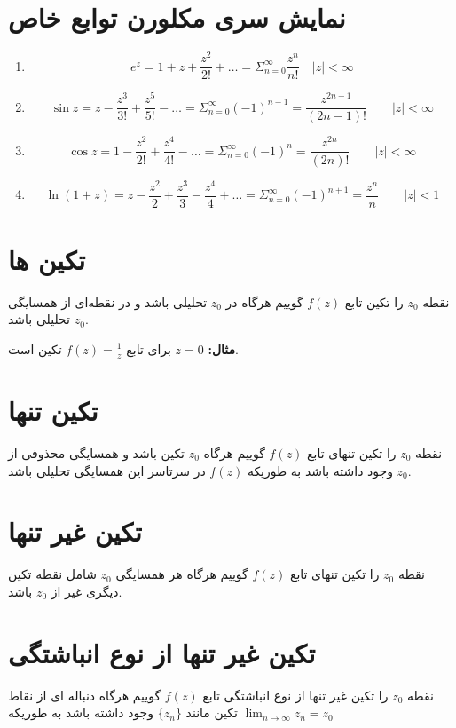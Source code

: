 \documentclass[12pt]{report}
\begin{document}
\section{نمایش سری مکلورن توابع خاص}
\begin{enumerate}
	
	\item
	$$e^z = 1 +z + \frac{z^2}{2!} + \dots = \Sigma_{n = 0}^{\infty} \frac{z^n}{n!} \quad |z|< \infty$$
	\item
	$$\sin z = z - \frac{z^3}{3!} +  \frac{z^5}{5!} - \dots = \Sigma_{n = 0}^{\infty} (-1)^{n -1 } = \frac{z^{2n - 1}}{(2n - 1)!}\qquad |z| < \infty$$
	\item
	$$\cos z = 1 - \frac{z^2}{2!} +  \frac{z^4}{4!} - \dots = \Sigma_{n = 0}^{\infty} (-1)^{n } = \frac{z^{2n }}{(2n)!}\qquad |z| < \infty$$
	\item
	$$\ln (1 + z) = z - \frac{z^2}{2} + \frac{z^3}{3} - \frac{z^4}{4} + \dots = \Sigma_{n = 0}^{\infty} (-1)^{n +1} = \frac{z^{n }}{n}\qquad |z| < 1$$
	
	
\end{enumerate}
\section{تکین ها}
نقطه
$z_0$
را تکین تابع
$f(z)$
گوییم هرگاه در 
$z_0$
تحلیلی باشد و در نقطه‌ای از همسایگی
$z_0$
تحلیلی باشد.
\newline

\textbf{مثال:}
$z = 0$
برای تابع
$f(z) = \frac{1}{z}$
تکین است.









\section{تکین تنها}
نقطه
$z_0$
را تکین تنهای تابع 
$f(z)$
گوییم هرگاه
$z_0$
تکین باشد و همسایگی محذوفی از
$z_0$
وجود داشته باشد به طوریکه
$f(z)$
در سرتاسر این همسایگی تحلیلی باشد.
\section{تکین غیر تنها}
نقطه
$z_0$
را تکین تنهای تابع
$f(z)$
گوییم هرگاه هر همسایگی 
$z_0$
شامل نقطه تکین دیگری غیر از 
$z_0$
باشد.
\section{تکین غیر تنها از نوع انباشتگی}
نقطه 
$z_0$
را تکین غیر تنها از نوع انباشتگی تابع 
$f(z)$
گوییم هرگاه دنباله ای از نقاط تکین مانند
$\{z_n\}$
وجود داشته باشد به طوریکه 
$\lim_{n \to \infty} z_n = z_0$
\newline
\end{document}
